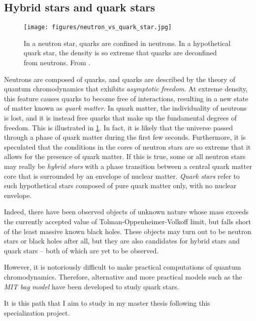 \subsection*{Hybrid stars and quark stars}

\begin{figure}
\centering
\texttt{[image: figures/neutron\_vs\_quark\_star.jpg]}
\caption{\label{fig:conclusion:neutron_vs_quark_star}%
	In a neutron star, quarks are confined in neutrons.
	In a hypothetical quark star, the density is so extreme that quarks are deconfined from neutrons.
	From \cite{ref:neutron_vs_quark_star}.
}
\end{figure}

Neutrons are composed of quarks, and quarks are described by the theory of quantum chromodynamics that exhibits \emph{asymptotic freedom}.
At extreme density, this feature causes quarks to become free of interactions, resulting in a new state of matter known as \emph{quark matter}.
In quark matter, the individuality of neutrons is lost, and it is instead free quarks that make up the fundamental degrees of freedom.
This is illustrated in \cref{fig:conclusion:neutron_vs_quark_star}.
In fact, it is likely that the universe passed through a phase of quark matter during the first few seconds.
Furthermore, it is speculated that the conditions in the cores of neutron stars are so extreme that it allows for the presence of quark matter.
If this is true, some or all neutron stars may really be \emph{hybrid stars} with a phase transition between a central quark matter core that is surrounded by an envelope of nuclear matter.
\emph{Quark stars} refer to such hypothetical stars composed of pure quark matter only, with no nuclear envelope.
\cite[chapter 8]{ref:glendenning}

Indeed, there have been observed objects of unknown nature whose mass exceeds the currently accepted value of Tolman-Oppenheimer-Volkoff limit, but falls short of the least massive known black holes. \cite{ref:wiki_list_star_massess}
These objects may turn out to be neutron stars or black holes after all, but they are also candidates for hybrid stars and quark stars -- both of which are yet to be observed.

However, it is notoriously difficult to make practical computations of quantum chromodynamics.
Therefore, alternative and more practical models such as the \emph{MIT bag model} have been developed to study quark stars.

It is this path that I aim to study in my master thesis following this specialization project.


